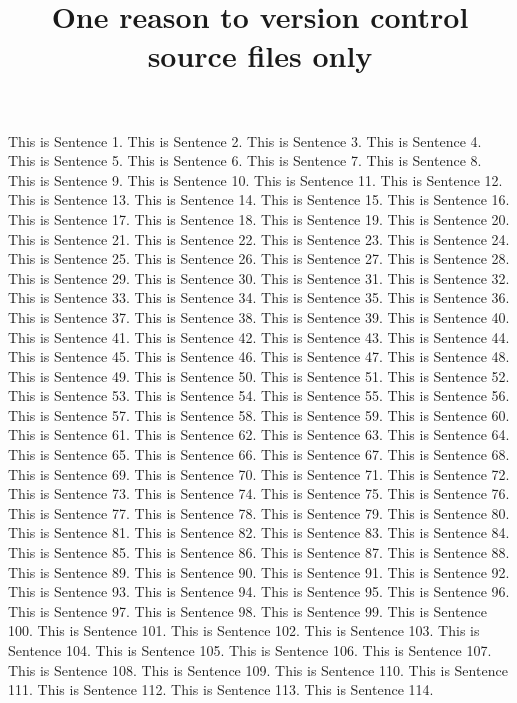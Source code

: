 \documentclass{article}
\title{One reason to version control source files only}
\begin{document}
\maketitle


This is Sentence 1.
This is Sentence 2.
This is Sentence 3.
This is Sentence 4.
This is Sentence 5.
This is Sentence 6.
This is Sentence 7.
This is Sentence 8.
This is Sentence 9.
This is Sentence 10.
This is Sentence 11.
This is Sentence 12.
This is Sentence 13.
This is Sentence 14.
This is Sentence 15.
This is Sentence 16.
This is Sentence 17.
This is Sentence 18.
This is Sentence 19.
This is Sentence 20.
This is Sentence 21.
This is Sentence 22.
This is Sentence 23.
This is Sentence 24.
This is Sentence 25.
This is Sentence 26.
This is Sentence 27.
This is Sentence 28.
This is Sentence 29.
This is Sentence 30.
This is Sentence 31.
This is Sentence 32.
This is Sentence 33.
This is Sentence 34.
This is Sentence 35.
This is Sentence 36.
This is Sentence 37.
This is Sentence 38.
This is Sentence 39.
This is Sentence 40.
This is Sentence 41.
This is Sentence 42.
This is Sentence 43.
This is Sentence 44.
This is Sentence 45.
This is Sentence 46.
This is Sentence 47.
This is Sentence 48.
This is Sentence 49.
This is Sentence 50.
This is Sentence 51.
This is Sentence 52.
This is Sentence 53.
This is Sentence 54.
This is Sentence 55.
This is Sentence 56.
This is Sentence 57.
This is Sentence 58.
This is Sentence 59.
This is Sentence 60.
This is Sentence 61.
This is Sentence 62.
This is Sentence 63.
This is Sentence 64.
This is Sentence 65.
This is Sentence 66.
This is Sentence 67.
This is Sentence 68.
This is Sentence 69.
This is Sentence 70.
This is Sentence 71.
This is Sentence 72.
This is Sentence 73.
This is Sentence 74.
This is Sentence 75.
This is Sentence 76.
This is Sentence 77.
This is Sentence 78.
This is Sentence 79.
This is Sentence 80.
This is Sentence 81.
This is Sentence 82.
This is Sentence 83.
This is Sentence 84.
This is Sentence 85.
This is Sentence 86.
This is Sentence 87.
This is Sentence 88.
This is Sentence 89.
This is Sentence 90.
This is Sentence 91.
This is Sentence 92.
This is Sentence 93.
This is Sentence 94.
This is Sentence 95.
This is Sentence 96.
This is Sentence 97.
This is Sentence 98.
This is Sentence 99.
This is Sentence 100.
This is Sentence 101.
This is Sentence 102.
This is Sentence 103.
This is Sentence 104.
This is Sentence 105.
This is Sentence 106.
This is Sentence 107.
This is Sentence 108.
This is Sentence 109.
This is Sentence 110.
This is Sentence 111.
This is Sentence 112.
This is Sentence 113.
This is Sentence 114.
\end{document}
